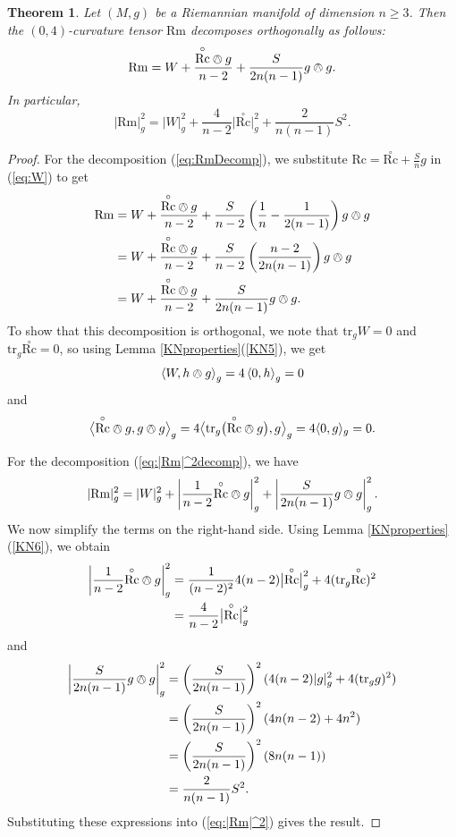\documentclass{amsart}
\numberwithin{equation}{section}
\newcommand{\tr}{\mathrm{tr}}
\newcommand{\law}{\left\langle}
\newcommand{\raw}{\right\rangle}
\newcommand{\Rc}{\mathrm{Rc}}
\newcommand{\Rm}{\mathrm{Rm}}
\newcommand{\tRc}{\overset{\circ}{\Rc}}
\theoremstyle{plain}
\newtheorem{thm}{Theorem}[section]
\theoremstyle{definition}
\theoremstyle{remark}
\begin{document}
\begin{thm}\label{thm:Rmdecomp}
Let $(M, g)$ be a Riemannian manifold of dimension $n \ge 3$. Then the $(0,4)$-curvature tensor $\Rm$ decomposes orthogonally as follows:
\begin{equation}
\label{eq:RmDecomp}
    \Rm = W + \frac{\tRc \owedge g}{n-2}+ \frac{S}{2n(n-1)}g \owedge g.
\end{equation}
In particular,
\begin{equation}
\label{eq:|Rm|^2decomp}
    \left|\Rm \right|_g^2 = |W|_g^2 + \frac{4}{n-2}\big|\tRc\big|_g^2 + \frac{2}{n(n-1)}S^2.
\end{equation}
\end{thm}
\begin{proof}
    For the decomposition (\ref{eq:RmDecomp}), we substitute $\Rc = \tRc + \frac{S}{n}g$ in (\ref{eq:W}) to get
    \begin{align*}
        \Rm &= W + \frac{\tRc \owedge g}{n-2} + \frac{S}{n-2}\left(\frac{1}{n} - \frac{1}{2(n-1)}\right)g \owedge g \\ 
        &=  W + \frac{\tRc \owedge g}{n-2} + \frac{S}{n-2}\left(\frac{n-2}{2n(n-1)}\right) g \owedge g \\
        &=  W + \frac{\tRc \owedge g}{n-2}+ \frac{S}{2n(n-1)}g \owedge g.
    \end{align*}
    To show that this decomposition is orthogonal, we note that $\tr_g W = 0$ and $\tr_g \tRc = 0$, so using Lemma \ref{KNproperties}(\ref{KN5}), we get
    \[\law W, h \owedge g \raw_g = 4\law 0, h \raw_g = 0\]
    and
    \[\big \langle \tRc \owedge g, g \owedge g \big \rangle_g = 4\big\langle \tr_g\big(\tRc \owedge g\big), g \big\rangle_g = 4\langle 0, g \rangle_g = 0.\]

    For the decomposition (\ref{eq:|Rm|^2decomp}), we have
    \begin{equation}
    \label{eq:|Rm|^2}
    |\Rm|_g^2 = |W|_g^2 + \left|\frac{1}{n-2} \tRc \owedge g\right|_g^2 + \left|\frac{S}{2n(n-1)}g \owedge g\right|_g^2.\end{equation}
    We now simplify the terms on the right-hand side. Using Lemma \ref{KNproperties}(\ref{KN6}), we obtain
    \begin{align*}
        \left|\frac{1}{n-2} \tRc \owedge g\right|_g^2 &= \frac{1}{(n-2)^2}4(n - 2)\big|\tRc\big|_g^2 + 4(\tr_g \tRc)^2 \\ 
        &= \frac{4}{n-2}\big|\tRc\big|_g^2
    \end{align*}
    and
    \begin{align*}
        \left|\frac{S}{2n(n-1)}g \owedge g\right|_g^2 &= \left(\frac{S}{2n(n-1)}\right)^2(4(n-2)|g|_g^2 + 4(\tr_g g)^2) \\ 
        &= \left(\frac{S}{2n(n-1)}\right)^2(4n(n-2) + 4n^2) \\ 
        &= \left(\frac{S}{2n(n-1)}\right)^2 \left(8n(n-1)\right) \\ 
        &= \frac{2}{n(n-1)}S^2.
    \end{align*}
    Substituting these expressions into (\ref{eq:|Rm|^2}) gives the result.
\end{proof}
\end{document}
